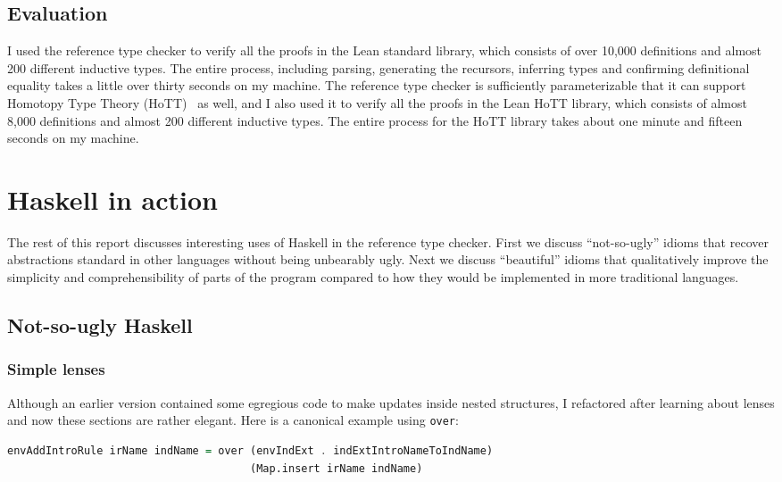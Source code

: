 \documentclass{article}
\begin{document}
\begin{spacing}{1.1}
\subsection{Evaluation}

I used the reference type checker to verify all the proofs in the Lean standard library, which consists of over 10,000 definitions and almost 200 different inductive types. The entire process, including parsing, generating the recursors, inferring types and confirming definitional equality takes a little over thirty seconds on my machine. The reference type checker is sufficiently parameterizable that it can support Homotopy Type Theory (HoTT)~\cite{awodey2015homotopy} as well, and I also used it to verify all the proofs in the Lean HoTT library, which consists of almost 8,000 definitions and almost 200 different inductive types. The entire process for the HoTT library takes about one minute and fifteen seconds on my machine.

\section{Haskell in action}

The rest of this report discusses interesting uses of Haskell in the reference type checker. First we discuss ``not-so-ugly'' idioms that recover abstractions standard in other languages without being unbearably ugly. Next we discuss ``beautiful'' idioms that qualitatively improve the simplicity and comprehensibility of parts of the program compared to how they would be implemented in more traditional languages.

\subsection{Not-so-ugly Haskell}

\subsubsection{Simple lenses}

Although an earlier version contained some egregious code to make updates inside nested structures, I refactored after learning about lenses and now these sections are rather elegant. Here is a canonical example using \lstinline{over}:
\begin{lstlisting}[language=Haskell]
envAddIntroRule irName indName = over (envIndExt . indExtIntroNameToIndName)
                                      (Map.insert irName indName)
\end{lstlisting}


\end{spacing}
\end{document}
